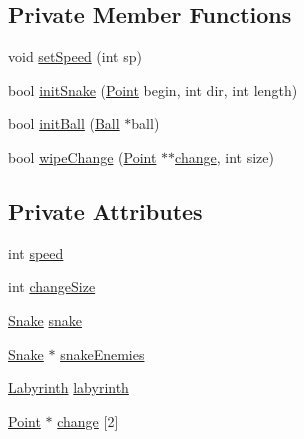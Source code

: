 \subsection*{Private Member Functions}
\begin{DoxyCompactItemize}
\item 
void \hyperlink{class_game_a5f3fdd22fa8ae39d6912ee3ff029ea46}{set\-Speed} (int sp)
\item 
bool \hyperlink{class_game_a0e8435182e77e921b5ba0471a8bfb20d}{init\-Snake} (\hyperlink{common_8h_aa9cfdb80b4ca12013a2de8a3b9b97981}{Point} begin, int dir, int length)
\item 
bool \hyperlink{class_game_a3702238c3fef205d19d1cb4bbc471c5c}{init\-Ball} (\hyperlink{class_ball}{Ball} $\ast$ball)
\item 
bool \hyperlink{class_game_aa73688f1ba069a3f1989884099c58449}{wipe\-Change} (\hyperlink{common_8h_aa9cfdb80b4ca12013a2de8a3b9b97981}{Point} $\ast$$\ast$\hyperlink{class_game_a87f9c54e60a724de2644769cd917dbce}{change}, int size)
\end{DoxyCompactItemize}
\subsection*{Private Attributes}
\begin{DoxyCompactItemize}
\item 
int \hyperlink{class_game_a02a58acc040d6d014e02832453695ef5}{speed}
\item 
int \hyperlink{class_game_ae959d08e508fcef98dd07a2b9cd82e65}{change\-Size}
\item 
\hyperlink{class_snake}{Snake} \hyperlink{class_game_ab77bfcc312425811000819791ea7668e}{snake}
\item 
\hyperlink{class_snake}{Snake} $\ast$ \hyperlink{class_game_ab7d2baa4a2dbcb64fc1611aac709fe40}{snake\-Enemies}
\item 
\hyperlink{class_labyrinth}{Labyrinth} \hyperlink{class_game_a92148f2659c019b331e9da7deadbd8bc}{labyrinth}
\item 
\hyperlink{common_8h_aa9cfdb80b4ca12013a2de8a3b9b97981}{Point} $\ast$ \hyperlink{class_game_a87f9c54e60a724de2644769cd917dbce}{change} \mbox{[}2\mbox{]}
\end{DoxyCompactItemize}


